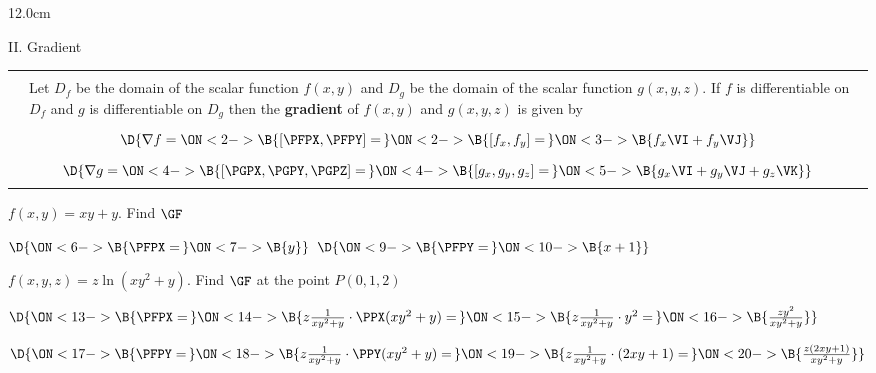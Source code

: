 \begin{frame}
\begin{columns}\begin{column}{12.0cm}

{II. Gradient}
\scriptsize
\begin{center}
{\setlength{\extrarowheight}{-0.2cm}
\begin{tabular}{|p{0.4cm}p{10.6cm}|}
	\hline
	\hline
	&\\
	\DEF & Let $D_f$ be the domain of the scalar function $f(x,y)$ and $D_g$ be the domain of the scalar function $g(x,y,z)$.  If $f$ is differentiable on $D_f$ and $g$ is differentiable on $D_g$ then the {\bf gradient} of $f(x,y)$ and $g(x,y,z)$ is given by \\
	&\\
	\multicolumn{2}{|c|}{$\D{\nabla f = 
	\ON<2->{\B{\left[\PFPX,\PFPY\right] =\,}} 
	\ON<2->{\B{\left[f_x,f_y\right] =\,}} 
	\ON<3->{\B{f_x \VI + f_y \VJ}}}$} \\
	& \\
	\multicolumn{2}{|c|}{$\D{\nabla g = 
	\ON<4->{\B{\left[\PGPX,\PGPY,\PGPZ\right] =\,}} 
	\ON<4->{\B{\left[g_x,g_y,g_z\right] =\,}} 
	\ON<5->{\B{g_x \VI + g_y \VJ + g_z \VK}}}$} \\
	& \\
	\hline
	\hline
\end{tabular}}
\end{center}
\EX $f(x,y) = xy + y$. \quad Find $\GF$

\vspace{0.2cm}

$\D{\ON<6->{\B{\PFPX =\,}} 
\ON<7->{\B{y}}}$ \quad 
{} \quad $\D{
\ON<9->{\B{\PFPY =\,}} 
\ON<10->{\B{x + 1}}}$ \quad 
{} \quad 
{}

\vspace{0.2cm}

\EX $f(x,y,z) = z\ln(xy^2 + y)$. \quad Find $\GF$ at the point $P(0,1,2)$

\vspace{0.1cm}

$\D{\ON<13->{\B{\PFPX =\,}} 
\ON<14->{\B{z\frac{1}{xy^2 + y}\cdot \PPX(xy^2 + y) = \,}} 
\ON<15->{\B{z\frac{1}{xy^2 + y}\cdot y^2 =\,}} 
\ON<16->{\B{\frac{zy^2}{xy^2 + y}}}}$

\vspace{0.1cm}

$\D{\ON<17->{\B{\PFPY = \,}}
\ON<18->{\B{z\frac{1}{xy^2 + y}\cdot \PPY(xy^2 + y) = \,}}
\ON<19->{\B{z\frac{1}{xy^2 + y}\cdot (2xy+1) =\,}}
\ON<20->{\B{\frac{z(2xy+1)}{xy^2 + y}}}}$


\end{column}
\end{columns}
\end{frame}
